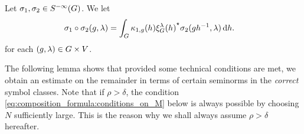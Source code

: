 \begin{definition}
    Let $\sigma_1, \sigma_2 \in {S^{-\infty} (G)}$.
    We let
    \begin{align*}
        \sigma_1 \circ \sigma_2(g, \lambda)
        &= \int_G \kappa_{1, g}(h) {\xi^{\lambda}_{G}(h)}^\star \sigma_2(g h^{-1}, \lambda) \,\mathrm{d} h.
    \end{align*}
    for each $(g, \lambda) \in G \times V$.
\end{definition}

The following lemma shows that provided some technical conditions are met,
we obtain an estimate on the remainder in terms of certain seminorms in the \emph{correct} symbol classes.
Note that if $\rho > \delta$,
the condition \eqref{eq:composition_formula:conditions_on_M} below is always possible by choosing $N$ sufficiently large.
This is the reason why we shall always assume $\rho > \delta$ hereafter.


